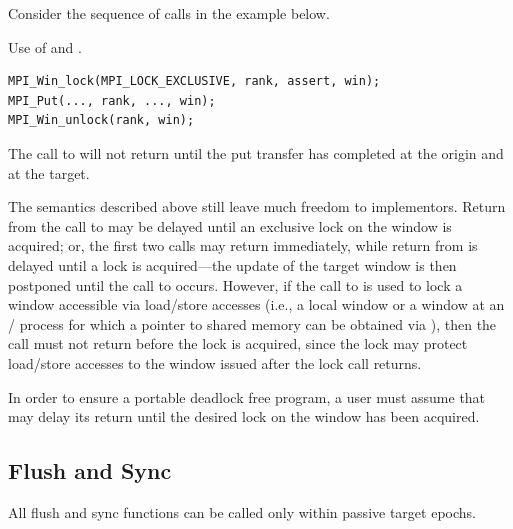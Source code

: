 Consider the sequence of calls in the example below.
\begin{example}
\label{ex:1sided-lock-unlock}%
%
Use of  and .
\begin{lstlisting}[language={[MPI]C}]
MPI_Win_lock(MPI_LOCK_EXCLUSIVE, rank, assert, win);
MPI_Put(..., rank, ..., win);
MPI_Win_unlock(rank, win);
\end{lstlisting}
The call to  will not return until the put
transfer has completed at the origin
and at the target.
\end{example}

\begin{implementors}
The semantics described above still leave much freedom to implementors.
Return from the call to
 may be delayed until an
exclusive lock on the window is acquired; or, the first
two calls may return immediately, while return from  is delayed until
a lock is acquired---the update of the target window is then
postponed until the call to  occurs.
However,  if the call to  is used to lock a
window accessible via load/store accesses (i.e., a local window or a window at an \MPI/ process
for which a pointer to shared memory can be obtained via ),
then the call must not return before the lock is acquired,
since the lock may protect load/store accesses to the window issued
after the lock call returns.
\end{implementors}

\begin{users}
In order to ensure a portable deadlock free program, a user must assume
that  may delay its return until the desired lock on the
window has been acquired.
\end{users}

\subsection{Flush and Sync}
\label{sec:1sided-flush}

All flush and sync functions can be called only within passive target
epochs.

